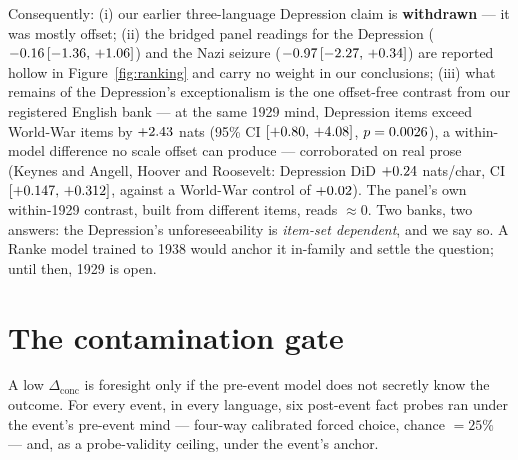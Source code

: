 \documentclass[11pt]{article}
\begin{document}
Consequently: (i) our earlier three-language Depression claim is \textbf{withdrawn} --- it was mostly
offset; (ii) the bridged panel readings for the Depression ($-0.16\,[-1.36,\,+1.06]$) and the Nazi seizure ($-0.97\,[-2.27,\,+0.34]$)
are reported hollow in Figure~\ref{fig:ranking} and carry no weight in our conclusions; (iii) what remains
of the Depression's exceptionalism is the one offset-free contrast from our registered English bank --- at
the same 1929 mind, Depression items exceed World-War items by $+2.43$ nats (95\% CI
$[+0.80,\,+4.08]$, $p=0.0026$), a within-model difference no scale offset can produce --- corroborated on
real prose (Keynes and Angell, Hoover and Roosevelt: Depression DiD $+0.24$ nats/char, CI
$[+0.147,\,+0.312]$, against a World-War control of $+0.02$). The panel's own within-1929 contrast,
built from different items, reads $\approx 0$. Two banks, two answers: the Depression's unforeseeability is
\emph{item-set dependent}, and we say so. A Ranke model trained to 1938 would anchor it in-family and
settle the question; until then, 1929 is open.

\section{The contamination gate}\label{sec:gate}

A low $\Delta_{\text{conc}}$ is foresight only if the pre-event model does not secretly know the outcome.
For every event, in every language, six post-event fact probes ran under the event's pre-event mind ---
four-way calibrated forced choice, chance $=25\%$ --- and, as a probe-validity ceiling, under the event's
anchor.

\begin{table}[t]\centering\small

\caption{\textbf{The gate, event by event.} GREEN = accuracy consistent with chance (binomial test): the
pre-event mind does not know the post-event facts, so its low conceptual surprise is foresight, not
leakage. The ceiling column shows the same probes under the hindsight anchor --- high accuracy there
validates the probes themselves. Items with pre-registered period-prior caveats (Morgan, Versailles,
Franz Ferdinand, Roosevelt) are excluded from verdicts and reported separately.
$^{\dagger}$The revolution's AMBER is driven by a single geography item (the peace ``at Brest-Litovsk,''
answered 3/3 while Lenin, the party, and the month sit at the floor) --- the signature of a place-name
prior, not event knowledge; excluding it post hoc gives $\Ngaterevposthoc$ ($p=\NgaterevposthocP$), GREEN.
The registered verdict stands, and the caveat travels with the revolution's foresight reading.}
\label{tab:gates}
\end{table}
\end{document}
